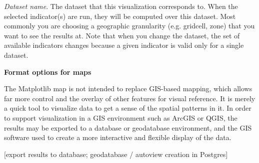 \emph{Dataset name}. The dataset that this visualization corresponds
to. When the selected indicator(s) are run, they will be computed over
this dataset. Most commonly you are choosing a geographic granularity
(e.g. gridcell, zone) that you want to see the results at. Note that
when you change the dataset, the set of available indicators changes
because a given indicator is valid only for a single dataset.

\bf{Format options for maps}

The Matplotlib map is not intended to replace GIS-based mapping, which
allows far more control and the overlay of other features for visual
reference.  It is merely a quick tool to visualize data to get a sense
of the spatial patterns in it.  In order to support visualization in a
GIS environment such as ArcGIS or QGIS, the results may be exported to
a database or geodatabase environment, and the GIS software used to
create a more interactive and flexible display of the data.




[export results to database; geodatabase / autoview creation in
Postgres]



